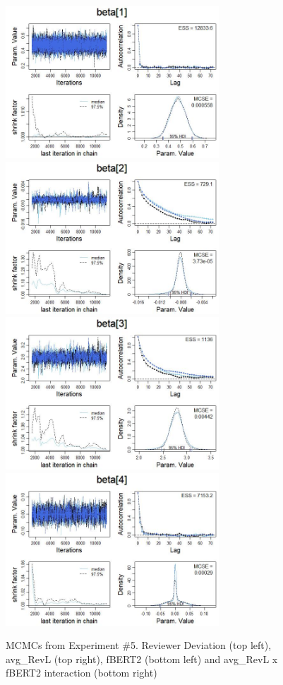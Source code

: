\documentclass[man, floatsintext, 10pt]{apa6}
\begin{document}
\begin{figure}
\includegraphics[width=8cm]{experiment_5_1.jpg}
\includegraphics[width=8cm]{experiment_5_2.jpg} \\

\includegraphics[width=8cm]{experiment_5_3.jpg}
\includegraphics[width=8cm]{experiment_5_4.jpg}
\caption{MCMCs from Experiment \#5. Reviewer Deviation (top left), avg\_RevL (top right), fBERT2 (bottom left) and avg\_RevL x fBERT2 interaction (bottom right)}
  \label{Exp5MCMC}
\end{figure}
\end{document}
